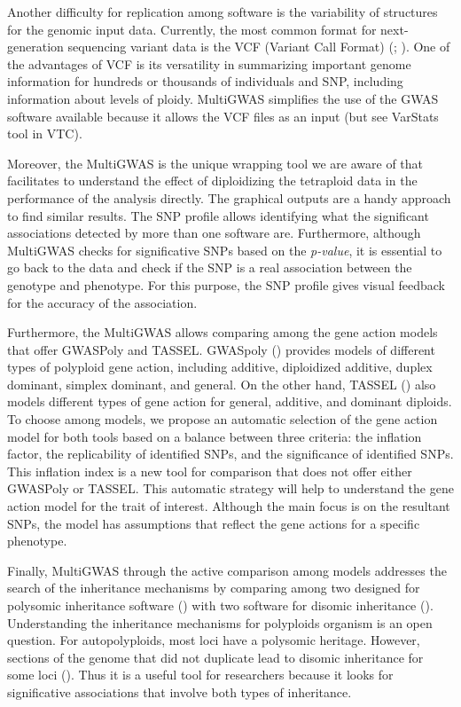 \documentclass{article}
\begin{document}
Another difficulty for replication among software is the variability of structures for the genomic input data. Currently, the most common format for next-generation sequencing variant data is the VCF (Variant Call Format) (\cite{Danecek2011}; \cite{Ebbert2014}). One of the advantages of VCF is its versatility in summarizing important genome information for hundreds or thousands of individuals and SNP, including information about levels of ploidy. MultiGWAS simplifies the use of the GWAS software available because it allows the VCF files as an input (but see VarStats tool in VTC).  

Moreover, the MultiGWAS is the unique wrapping tool we are aware of that facilitates to understand the effect of diploidizing the tetraploid data in the performance of the analysis directly. The graphical outputs are a handy approach to find similar results. The SNP profile allows identifying what the significant associations detected by more than one software are. Furthermore, although MultiGWAS checks for significative SNPs based on the \emph{p-value}, it is essential to go back to the data and check if the SNP is a real association between the genotype and phenotype. For this purpose, the SNP profile gives visual feedback for the accuracy of the association.

Furthermore, the MultiGWAS allows comparing among the gene action models that offer GWASPoly and TASSEL. GWASpoly (\cite{Rosyara2016}) provides models of different types of polyploid gene action, including additive, diploidized additive, duplex dominant, simplex dominant, and general. On the other hand, TASSEL (\cite{Bradbury2007}) also models different types of gene action for general, additive, and dominant diploids. To choose among models, we propose an automatic selection of the gene action model for both tools based on a balance between three criteria: the inflation factor, the replicability of identified SNPs, and the significance of identified SNPs. This inflation index is a new tool for comparison that does not offer either GWASPoly or TASSEL. This automatic strategy will help to understand the gene action model for the trait of interest. Although the main focus is on the resultant SNPs, the model has assumptions that reflect the gene actions for a specific phenotype.

Finally, MultiGWAS  through the active comparison among models addresses the search of the inheritance mechanisms by comparing among two designed for polysomic inheritance software (\cite{Rosyara2016, Shen2016}) with two software for disomic inheritance (\cite{Purcell2007, Bradbury2007}). Understanding the inheritance mechanisms for polyploids organism is an open question. For autopolyploids, most loci have a polysomic heritage. However, sections of the genome that did not duplicate lead to disomic inheritance for some loci (\cite{ohno1970, lynch2000,dufresne2014}). Thus it is a useful tool for researchers because it looks for significative associations that involve both types of inheritance.
\end{document}
